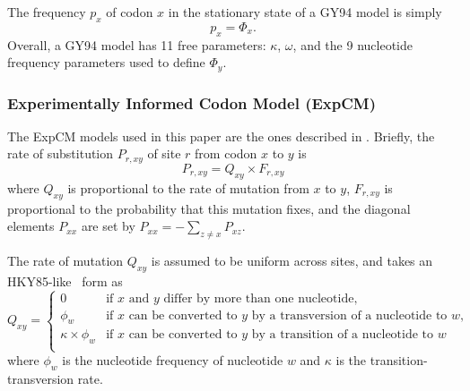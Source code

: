 \documentclass[11pt]{article}
\begin{document}
The frequency $p_x$ of codon $x$ in the stationary state of a GY94 model is simply 
\begin{equation}
\label{eq:px}
p_{x} = \Phi_x.
\end{equation}
Overall, a GY94 model has 11 free parameters: $\kappa$, $\omega$, and the 9 nucleotide frequency parameters used to define $\Phi_y$. 

\subsubsection*{Experimentally Informed Codon Model (ExpCM)}

The ExpCM models used in this paper are the ones described in \citet{bloom2017identification}. 
Briefly, the rate of substitution $P_{r,xy}$ of site $r$ from codon $x$ to $y$ is 
\begin{equation}
\label{eq:ExpCM}
P_{r,xy} = Q_{xy} \times F_{r,xy}
\end{equation}
where $Q_{xy}$ is proportional to the rate of mutation from $x$ to $y$, $F_{r,xy}$ is proportional to the probability that this mutation fixes, and the diagonal elements $P_{xx}$ are set by $P_{xx} = -\sum_{z \ne x} P_{xz}$. 

The rate of mutation $Q_{xy}$ is assumed to be uniform across sites, and takes an HKY85-like~\citep{hasegawa1985dating} form as 
\begin{equation}
\label{eq:Qxy}
   Q_{xy} = \begin{cases}
            0 & \mbox{if $x$ and $y$ differ by more than one nucleotide,} \\
            \phi_w & \mbox{if $x$ can be converted to $y$ by a transversion of a nucleotide to $w$,} \\
            \kappa \times \phi_w & \mbox{if $x$ can be converted to $y$ by a transition of a nucleotide to $w$} \\
            \end{cases}
\end{equation}
where $\phi_w$ is the nucleotide frequency of nucleotide $w$ and $\kappa$ is the transition-transversion rate.
\end{document}
